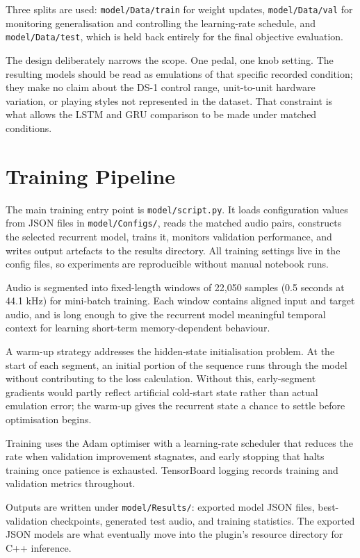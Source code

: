 Three splits are used: \texttt{model/Data/train} for weight updates, \texttt{model/Data/val} for monitoring generalisation and controlling the learning-rate schedule, and \texttt{model/Data/test}, which is held back entirely for the final objective evaluation.

The design deliberately narrows the scope. One pedal, one knob setting. The resulting models should be read as emulations of that specific recorded condition; they make no claim about the DS-1 control range, unit-to-unit hardware variation, or playing styles not represented in the dataset. That constraint is what allows the LSTM and GRU comparison to be made under matched conditions.

\section{Training Pipeline}
\label{sec:training-pipeline}

The main training entry point is \texttt{model/script.py}. It loads configuration values from JSON files in \texttt{model/Configs/}, reads the matched audio pairs, constructs the selected recurrent model, trains it, monitors validation performance, and writes output artefacts to the results directory. All training settings live in the config files, so experiments are reproducible without manual notebook runs.

Audio is segmented into fixed-length windows of 22,050 samples (0.5 seconds at 44.1 kHz) for mini-batch training. Each window contains aligned input and target audio, and is long enough to give the recurrent model meaningful temporal context for learning short-term memory-dependent behaviour.

A warm-up strategy addresses the hidden-state initialisation problem. At the start of each segment, an initial portion of the sequence runs through the model without contributing to the loss calculation. Without this, early-segment gradients would partly reflect artificial cold-start state rather than actual emulation error; the warm-up gives the recurrent state a chance to settle before optimisation begins.

Training uses the Adam optimiser with a learning-rate scheduler that reduces the rate when validation improvement stagnates, and early stopping that halts training once patience is exhausted. TensorBoard logging records training and validation metrics throughout.

Outputs are written under \texttt{model/Results/}: exported model JSON files, best-validation checkpoints, generated test audio, and training statistics. The exported JSON models are what eventually move into the plugin's resource directory for C++ inference.

